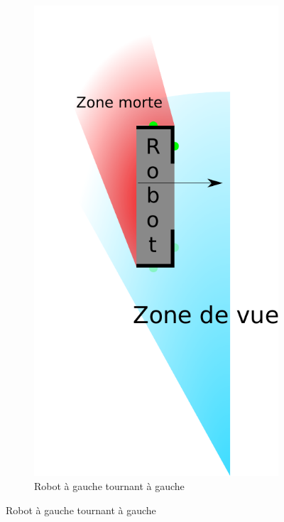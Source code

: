 \begin{itemize}
					\begin{figure}[H]
						\centering
						\begin{subfigure}[h]{0.2\textwidth}
					        \includegraphics[width=\textwidth]{Graphics/casClignotants_DG.pdf}
					        \caption{Robot à gauche tournant à gauche}
					    \end{subfigure}

\end{figure}
\end{itemize}
